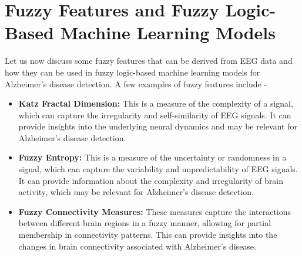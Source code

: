 \documentclass[openany]{book}
\begin{document}
\section{Fuzzy Features and Fuzzy Logic-Based Machine Learning Models}
Let us now discuss some fuzzy features that can be derived from EEG data and how they can be used in fuzzy logic-based machine learning models for Alzheimer's disease detection. A few examples of fuzzy features include -
\begin{itemize}
    \item \textbf{Katz Fractal Dimension:} This is a measure of the complexity of a signal, which can capture the irregularity and self-similarity of EEG signals. It can provide insights into the underlying neural dynamics and may be relevant for Alzheimer's disease detection.
    \item \textbf{Fuzzy Entropy:} This is a measure of the uncertainty or randomness in a signal, which can capture the variability and unpredictability of EEG signals. It can provide information about the complexity and irregularity of brain activity, which may be relevant for Alzheimer's disease detection.
    \item \textbf{Fuzzy Connectivity Measures:} These measures capture the interactions between different brain regions in a fuzzy manner, allowing for partial membership in connectivity patterns. This can provide insights into the changes in brain connectivity associated with Alzheimer's disease.
\end{itemize}
\end{document}
